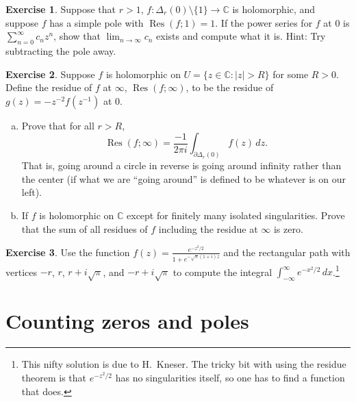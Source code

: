 \documentclass[12pt,openany]{book}
\newcommand{\sabs}[1]{\lvert {#1} \rvert}
\newcommand{\C}{{\mathbb{C}}}
\newcommand{\myquote}[1]{``#1''}
\theoremstyle{plain}
\theoremstyle{remark}
\theoremstyle{definition}
\newenvironment{exbox}{%
    \def\FrameCommand{\vrule width 1pt \relax\hspace{10pt}}%
    \MakeFramed{\advance\hsize-\width\FrameRestore}%
}{%
    \endMakeFramed
}
\newenvironment{exparts}{%
    \leavevmode\begin{enumerate}[a),noitemsep,topsep=0pt,parsep=0pt,partopsep=0pt]
}{%
    \end{enumerate}
}
\theoremstyle{exercise}
\newtheorem{exercise}{Exercise}[section]
\theoremstyle{example}
\begin{document}
\begin{savenotes}
\begin{exbox}
\begin{exercise}
Suppose that $r > 1$, $f \colon \Delta_r(0) \setminus \{ 1 \} \to \C$ is
holomorphic, and suppose $f$ has a simple pole with $\operatorname{Res}(f;1) = 1$.
If the power series for $f$ at 0 is $\sum_{n=0}^\infty c_n z^n$, show that
$\lim_{n\to \infty} c_n$ exists and compute what it is.  Hint: Try
subtracting the pole away.
\end{exercise}

\begin{exercise}
Suppose $f$ is holomorphic on $U = \{ z \in \C : \sabs{z} > R \}$ for 
some $R > 0$.
Define the residue of $f$ at $\infty$,
$\operatorname{Res}(f;\infty)$, to be the residue
of $g(z) = -z^{-2} f(z^{-1})$ at $0$.
\begin{exparts}
\item
Prove that for all $r > R$,
\begin{equation*}
\operatorname{Res}(f;\infty) = \frac{-1}{2\pi i} \int_{\partial \Delta_r(0)}
f(z) \, dz .
\end{equation*}
That is, going around a circle in reverse is going around infinity rather
than the center (if what we are \myquote{going around} is defined to be whatever
is on our left).
\item
If $f$ is holomorphic on $\C$ except for finitely many isolated
singularities.  Prove that the sum of all residues of $f$ including the
residue at $\infty$ is zero.
\end{exparts}
\end{exercise}

\begin{exercise}
Use the function $f(z) = \frac{e^{-z^2/2}}{1+e^{-\sqrt{\pi}(1+i)z}}$ and
the rectangular path with vertices $-r$, $r$, $r+i\sqrt{\pi}$,
and $-r+i\sqrt{\pi}$
to compute the integral $\int_{-\infty}^\infty e^{-x^2/2} \, dx$.\footnote{%
This nifty solution is due to H.\ Kneser. The tricky bit with using the
residue theorem is that $e^{-z^2/2}$ has no singularities itself,
so one has to find a function that does.}
\end{exercise}
\end{exbox}
\end{savenotes}


\section{Counting zeros and poles}
\end{document}
